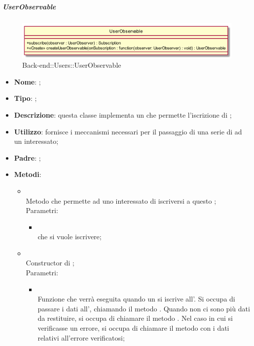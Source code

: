 \hypertarget{UserObservable_label}{\subparagraph{UserObservable}}
\begin{figure}[h]
	\centering
	\includegraphics[width=\textwidth,height=\textheight,keepaspectratio]{images/ClassUserObservable.png}
	\caption{Back-end::Users::UserObservable}
\end{figure}
\begin{itemize}
	\item \textbf{Nome}: ;
	\item \textbf{Tipo}: ;
	\item \textbf{Descrizione}: questa classe implementa un  che permette l'iscrizione di ;
	\item \textbf{Utilizzo}: fornisce i meccanismi necessari per il passaggio di una serie di  ad un  interessato;
	\item \textbf{Padre}: ;
	\item \textbf{Metodi}:
	\begin{itemize}
		\item[]  \\		Metodo che permette ad uno  interessato di iscriversi a questo ;\\
		Parametri:
		\begin{itemize}
			\item {} \\
			 che si vuole iscrivere;
		\end{itemize}
		\item[]  \\		Constructor di ;\\
		Parametri:
		\begin{itemize}
			\item {} \\
			Funzione che verrà eseguita quando un  si iscrive all'. Si occupa di passare i dati all', chiamando il metodo . Quando non ci sono più dati da restituire, si occupa di chiamare il metodo . Nel caso in cui si verificasse un errore, si occupa di chiamare il metodo  con i dati relativi all'errore verificatosi;

\end{itemize}
\end{itemize}
\end{itemize}
